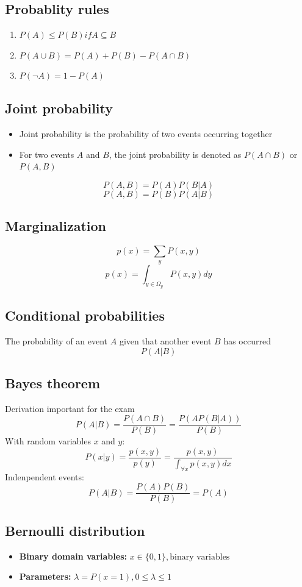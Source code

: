 \documentclass[12pt,a4paper]{article}
\begin{document}
\subsection{Probablity rules}
\begin{enumerate}
    \item $P(A) \leq P(B) if A \subseteq B$
    \item $P(A \cup B) = P(A) + P(B) - P(A \cap B)$
    \item $P(\neg A) = 1 - P(A)$
\end{enumerate}

\subsection{Joint probability}
\begin{itemize}
    \item Joint probability is the probability of two events occurring together
    \item For two events $A$ and $B$, the joint probability is denoted as $P(A \cap B)$ or $P(A, B)$
\end{itemize}
\[
P(A, B) = P(A)P(B|A)
\]
\[
P(A, B) = P(B)P(A|B)
\]

\subsection{Marginalization}
\[
p(x) = \sum_{y} P(x,y)
\]
\[
p(x) = \int_{y \in \Omega_y}^{} P(x,y) dy
\]

\subsection{Conditional probabilities}
The probability of an event $A$ given that another event $B$ has occurred 
\[
P(A|B)
\]

\subsection{Bayes theorem}
Derivation important for the exam
\[
P(A|B) = \frac{P(A \cap B)}{P(B)} = \frac{P(AP(B|A))}{P(B)}
\]
With random variables $x$ and $y$:
\[
P(x|y) = \frac{p(x, y)}{p(y)} = \frac{p(x,y)}{\int_{\forall x}^{} p(x,y) dx}
\]
Indenpendent events:
\[
P(A|B) = \frac{P(A)P(B)}{P(B)} = P(A)
\]

\subsection{Bernoulli distribution}
\begin{itemize}
    \item \textbf{Binary domain variables:} $x \in \{0, 1\}, \text{binary variables}$
    \item \textbf{Parameters:} $\lambda = P(x = 1), 0 \leq \lambda \leq 1$
\end{itemize}
\end{document}

